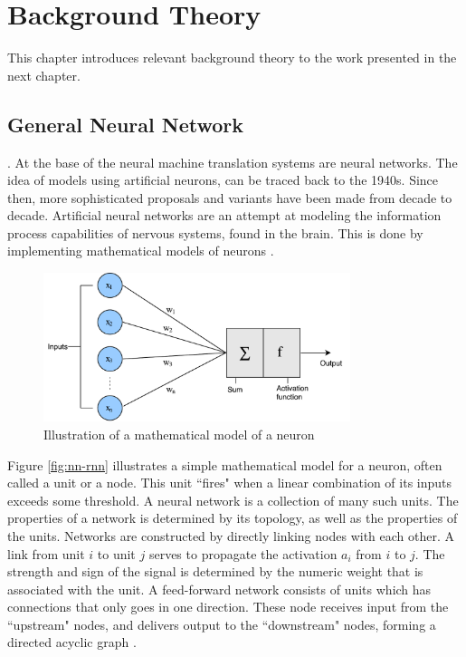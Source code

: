 
\chapter{Background Theory}
\label{ch:background}
This chapter introduces relevant background theory to the work presented in the next chapter. 


\section{General Neural Network}
. At the base of the neural machine translation systems are neural networks. The idea of models using artificial neurons, can be traced back to the 1940s. Since then, more sophisticated proposals and variants have been made from decade to decade. Artificial neural networks are an attempt at modeling the information process capabilities of nervous systems, found in the brain. This is done by implementing mathematical models of neurons \citep{russell2010aimodernapproach}.

\begin{figure}[ht]
    \centering
    \includegraphics[width=0.8\textwidth]{fig/related_work/nn_perceptron.pdf}
    \caption{Illustration of a mathematical model of a neuron}
    \label{fig:nn-perceptron}
\end{figure}

Figure \ref{fig:nn-rnn} illustrates a simple mathematical model for a neuron, often called a unit or a node. This unit ``fires" when a linear combination of its inputs exceeds some threshold. A neural network is a collection of many such units. The properties of a network is determined by its topology, as well as the properties of the units. Networks are constructed by directly linking nodes with each other. A link from unit \(i\) to unit \(j\) serves to propagate the activation \(a_{i}\) from \(i\) to \(j\). The strength and sign of the signal is determined by the numeric weight that is associated with the unit. A feed-forward network consists of units which has connections that only goes in one direction. These node receives input from the ``upstream" nodes, and delivers output to the ``downstream" nodes, forming a directed acyclic graph \citep{russell2010aimodernapproach}.

